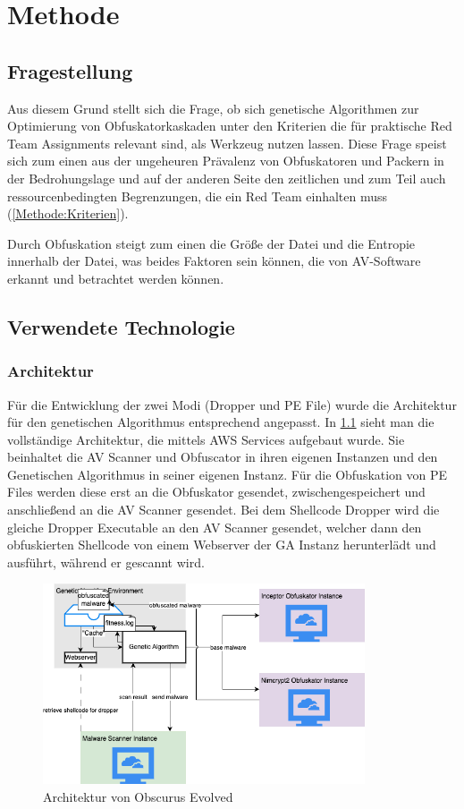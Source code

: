 \chapter{Methode}
\label{chapt:Methode}
\section{Fragestellung}
Aus diesem Grund stellt sich die Frage, ob sich genetische Algorithmen zur Optimierung von Obfuskatorkaskaden unter den Kriterien die für praktische Red Team Assignments relevant sind, als Werkzeug nutzen lassen. Diese Frage speist sich zum einen aus der ungeheuren Prävalenz von Obfuskatoren und Packern in der Bedrohungslage \cite{alkhateeb_2023_a} und auf der anderen Seite den zeitlichen und zum Teil auch ressourcenbedingten Begrenzungen, die ein Red Team einhalten muss (\ref{Methode:Kriterien}). 

Durch Obfuskation steigt zum einen die Größe der Datei und die Entropie innerhalb der Datei, was beides Faktoren sein können, die von AV-Software erkannt und betrachtet werden können.





\section{Verwendete Technologie}
\subsection{Architektur}
Für die Entwicklung der zwei Modi (Dropper und PE File) wurde die Architektur für den genetischen Algorithmus entsprechend angepasst. In \ref{fig:architecture} sieht man die vollständige Architektur, die mittels AWS Services aufgebaut wurde. Sie beinhaltet die AV Scanner und Obfuscator in ihren eigenen Instanzen und den Genetischen Algorithmus in seiner eigenen Instanz. Für die Obfuskation von PE Files werden diese erst an die Obfuskator gesendet, zwischengespeichert und anschließend an die AV Scanner gesendet. Bei dem Shellcode Dropper wird die gleiche Dropper Executable an den AV Scanner gesendet, welcher dann den obfuskierten Shellcode von einem Webserver der GA Instanz herunterlädt und ausführt, während er gescannt wird.
\begin{figure}[h]
    \centering
    \includegraphics[width=0.85\textwidth]{gfx/Abbildungen/Architektur.drawio.png}
    \caption{Architektur von Obscurus Evolved}
    \label{fig:architecture}
\end{figure}
